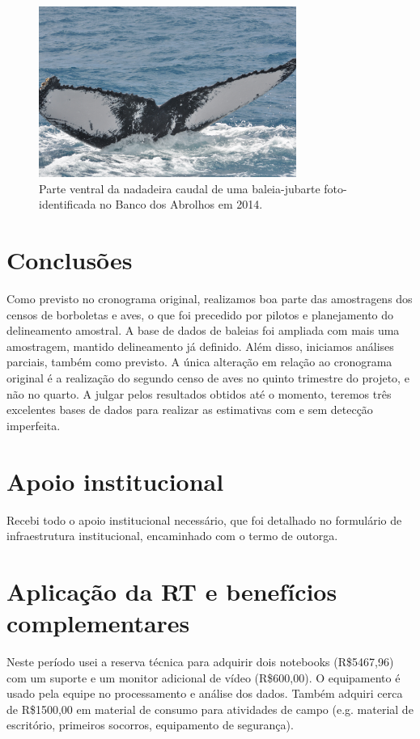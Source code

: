 \documentclass[12pt, A4]{article}
\begin{document}
\begin{figure}
  \centering
\includegraphics[width=0.75\textwidth]{figures/DSC_0393/DSC_0393.JPG}
  \caption{Parte ventral da nadadeira caudal de uma baleia-jubarte foto-identificada  no Banco dos Abrolhos em 2014.}
\label{fig:baleia2} 
\end{figure}


\section{Conclusões} %
Como previsto no cronograma original, realizamos boa parte das amostragens dos censos de borboletas e aves,
o que foi precedido por pilotos e planejamento do delineamento amostral. 
A base de dados de baleias foi ampliada com mais uma
amostragem, mantido delineamento já definido. 
Além disso, iniciamos análises parciais, também como previsto.
A única alteração em relação ao cronograma original 
é a realização do segundo censo de aves no quinto trimestre do projeto, e não no quarto. 
A julgar pelos resultados obtidos até o momento, teremos três excelentes bases de dados para realizar
as estimativas com e sem detecção imperfeita.

\section{Apoio institucional} %
Recebi todo o apoio institucional necessário, que foi detalhado no formulário de infraestrutura institucional, 
encaminhado com o termo de outorga. 

\section{Aplicação da RT e benefícios complementares} %
Neste período usei a reserva técnica para adquirir dois notebooks (R\$5467,96)
com um suporte e um monitor adicional de vídeo (R\$600,00).
O equipamento é usado pela equipe no processamento e análise dos dados.
Também adquiri cerca de R\$1500,00 em material de consumo para atividades de campo
(e.g. material de escritório, primeiros socorros, equipamento de segurança).
\end{document}
